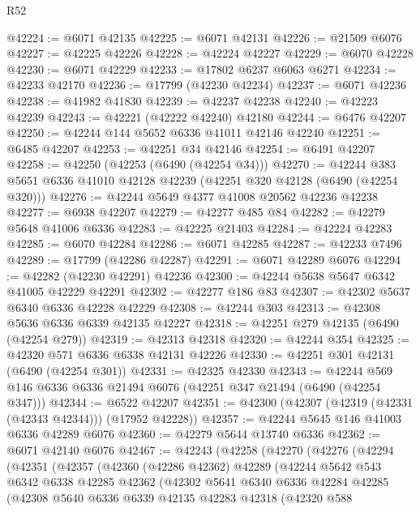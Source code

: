 \begin{lexlean}{R52}
\begin{coremodule}
@42224 := @6071 @42135
@42225 := @6071 @42131
@42226 := @21509 @6076
@42227 := @42225 @42226
@42228 := @42224 @42227
@42229 := @6070 @42228
@42230 := @6071 @42229
@42233 := @17802 @6237 @6063 @6271
@42234 := @42233 @42170
@42236 := @17799 (@42230 @42234)
@42237 := @6071 @42236
@42238 := @41982 @41830
@42239 := @42237 @42238
@42240 := @42223 @42239
@42243 := @42221 (@42222 @42240) @42180
@42244 := @6476 @42207
@42250 := @42244 @144 @5652 @6336 @41011 @42146 @42240
@42251 := @6485 @42207
@42253 := @42251 @34 @42146
@42254 := @6491 @42207
@42258 := @42250 (@42253 (@6490 (@42254 @34)))
@42270 := @42244 @383 @5651 @6336 @41010 @42128 @42239 (@42251 @320 @42128 (@6490 (@42254 @320)))
@42276 := @42244 @5649 @4377 @41008 @20562 @42236 @42238
@42277 := @6938 @42207
@42279 := @42277 @485 @84
@42282 := @42279 @5648 @41006 @6336
@42283 := @42225 @21403
@42284 := @42224 @42283
@42285 := @6070 @42284
@42286 := @6071 @42285
@42287 := @42233 @7496
@42289 := @17799 (@42286 @42287)
@42291 := @6071 @42289 @6076
@42294 := @42282 (@42230 @42291) @42236
@42300 := @42244 @5638 @5647 @6342 @41005 @42229 @42291
@42302 := @42277 @186 @83
@42307 := @42302 @5637 @6340 @6336 @42228 @42229
@42308 := @42244 @303
@42313 := @42308 @5636 @6336 @6339 @42135 @42227
@42318 := @42251 @279 @42135 (@6490 (@42254 @279))
@42319 := @42313 @42318
@42320 := @42244 @354
@42325 := @42320 @571 @6336 @6338 @42131 @42226
@42330 := @42251 @301 @42131 (@6490 (@42254 @301))
@42331 := @42325 @42330
@42343 := @42244 @569 @146 @6336 @6336 @21494 @6076 (@42251 @347 @21494 (@6490 (@42254 @347)))
@42344 := @6522 @42207
@42351 := @42300 (@42307 (@42319 (@42331 (@42343 @42344))) (@17952 @42228))
@42357 := @42244 @5645 @146 @41003 @6336 @42289 @6076
@42360 := @42279 @5644 @13740 @6336
@42362 := @6071 @42140 @6076
@42467 := @42243
    (@42258
      (@42270
        (@42276
          (@42294
            (@42351
              (@42357
                (@42360
                  (@42286 @42362)
                  @42289
                  (@42244
                    @5642
                    @543
                    @6342
                    @6338
                    @42285
                    @42362
                    (@42302
                      @5641
                      @6340
                      @6336
                      @42284
                      @42285
                      (@42308
                        @5640
                        @6336
                        @6339
                        @42135
                        @42283
                        @42318
                        (@42320
                          @588

\end{coremodule}
\end{lexlean}
